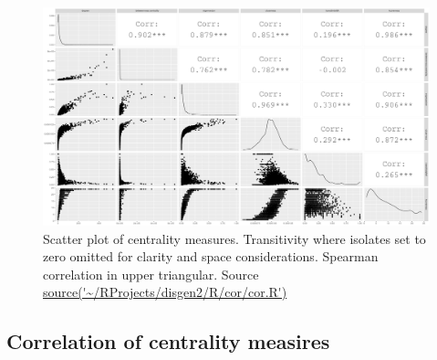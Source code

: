 \begin{figure} 
    \centering
    \includegraphics[width=\textwidth]{images/chapter3/cor_pairs/ggally/Rplot_corr_plot_ggally_large_size_11.png}
    \caption{Scatter plot of centrality measures. Transitivity where isolates set to zero omitted for clarity and space considerations. Spearman correlation in upper triangular. Source \url{source('~/RProjects/disgen2/R/cor/cor.R')}}
    \label{fig:scatter plot of multiple centralities gg ally}
\end{figure}


\subsection{Correlation of centrality measires}


